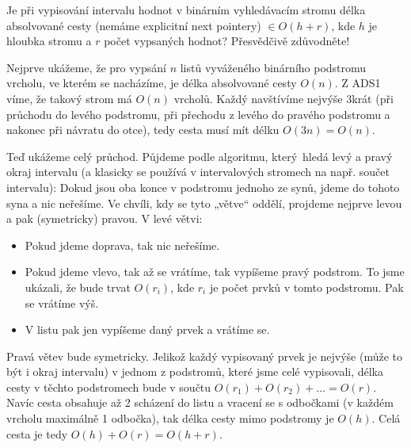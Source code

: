 \documentclass[12pt]{article}                   %
\begin{document}
\begin{priklad}[indukce]
	Je při vypisování intervalu hodnot v binárním vyhledávacím stromu délka absolvované cesty (nemáme explicitní next pointery) $\in O(h + r)$, kde $h$ je hloubka stromu a $r$ počet vypsaných hodnot? Přesvědčivě zdůvodněte!

	\begin{dukazin}[Ano je!]
		Nejprve ukážeme, že pro vypsání $n$ listů vyváženého binárního podstromu vrcholu, ve kterém se nacházíme, je délka absolvované cesty $O(n)$. Z ADS1 víme, že takový strom má $O(n)$ vrcholů. Každý navštívíme nejvýše 3krát (při průchodu do levého podstromu, při přechodu z levého do pravého podstromu a nakonec při návratu do otce), tedy cesta musí mít délku $O(3n) = O(n)$.

		Teď ukážeme celý průchod. Půjdeme podle algoritmu, který hledá levý a pravý okraj intervalu (a klasicky se používá v intervalových stromech na např. součet intervalu): Dokud jsou oba konce v podstromu jednoho ze synů, jdeme do tohoto syna a nic neřešíme. Ve chvíli, kdy se tyto „větve“ oddělí, projdeme nejprve levou a pak (symetricky) pravou. V levé větvi:\\[-2em]
		\begin{itemize}
			\item Pokud jdeme doprava, tak nic neřešíme.
			\item Pokud jdeme vlevo, tak až se vrátíme, tak vypíšeme pravý podstrom. To jsme ukázali, že bude trvat $O(r_i)$, kde $r_i$ je počet prvků v tomto podstromu. Pak se vrátíme výš.
			\item V listu pak jen vypíšeme daný prvek a vrátíme se.
		\end{itemize}
		Pravá větev bude symetricky. Jelikož každý vypisovaný prvek je nejvýše (může to být i okraj intervalu) v jednom z podstromů, které jsme celé vypisovali, délka cesty v těchto podstromech bude v součtu $O(r_1) + O(r_2) + … = O(r)$. Navíc cesta obsahuje až 2 scházení do listu a vracení se s odbočkami (v každém vrcholu maximálně 1 odbočka), tak délka cesty mimo podstromy je $O(h)$. Celá cesta je tedy $O(h) + O(r) = O(h + r)$.
	\end{dukazin}
\end{priklad}
\end{document}
